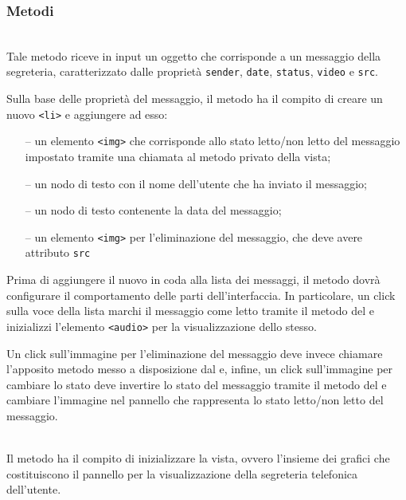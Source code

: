 \subsubsection*{Metodi}
\begin{description}

\item{}\\
  Tale metodo riceve in input un oggetto che corrisponde a un messaggio della segreteria, caratterizzato dalle proprietà \verb'sender', \verb'date', \verb'status', \verb'video' e \verb'src'.
  
  Sulla base delle proprietà del messaggio, il metodo ha il compito di creare un nuovo \verb'<li>' e aggiungere ad esso:
  \begin{itemize}
    \item[--] un elemento \verb'<img>' che corrisponde allo stato letto/non letto del messaggio impostato tramite una chiamata al metodo privato  della vista;
    \item[--] un nodo di testo con il nome dell'utente che ha inviato il messaggio;
    \item[--] un nodo di testo contenente la data del messaggio;
    \item[--] un elemento \verb'<img>' per l'eliminazione del messaggio, che deve avere attributo \verb'src'
  \end{itemize}
  
  Prima di aggiungere il nuovo  in coda alla lista dei messaggi, il metodo dovrà configurare il comportamento delle parti dell'interfaccia. In particolare, un click sulla voce della lista marchi il messaggio come letto tramite il metodo  del  e inizializzi l'elemento \verb'<audio>' per la visualizzazione dello stesso.
  
  Un click sull'immagine per l'eliminazione del messaggio deve invece chiamare l'apposito metodo  messo a disposizione dal  e, infine, un click sull'immagine per cambiare lo stato deve invertire lo stato del messaggio tramite il metodo  del  e cambiare l'immagine nel pannello che rappresenta lo stato letto/non letto del messaggio.

  \item{}\\
  Il metodo ha il compito di inizializzare la vista, ovvero l'insieme dei  grafici che costituiscono il pannello per la visualizzazione della segreteria telefonica dell'utente.
  

\end{description}
